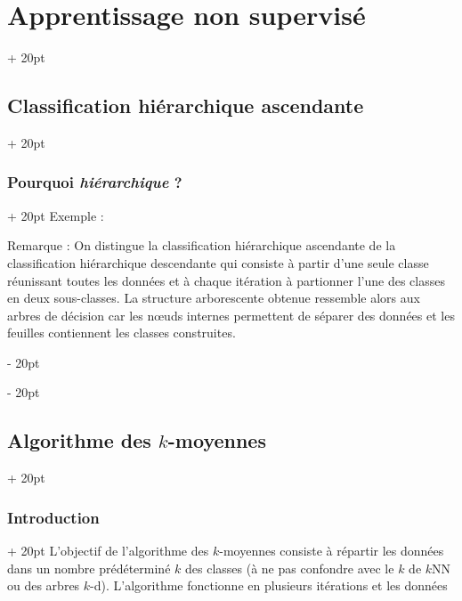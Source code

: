 \documentclass[a4paper, 12pt, twoside]{article}
\newcommand{\ind}[1][20pt]{\advance\leftskip + #1}
\newcommand{\deind}[1][20pt]{\advance\leftskip - #1}
\newenvironment{indt}[2][20pt]{#2 \par \ind[#1]}{\par \deind} %
\begin{document}
\begin{indt}{\section{Apprentissage non supervisé}}
\begin{indt}{\subsection{Classification hiérarchique ascendante}}
\begin{indt}{\subsubsection{Pourquoi \emph{hiérarchique} ?}}
                Exemple :

                \begin{center}
                \end{center}

                Remarque :
                On distingue la classification hiérarchique ascendante de la classification hiérarchique descendante qui consiste à partir d'une seule classe réunissant toutes les données et à chaque itération à partionner l'une des classes en deux sous-classes.
                La structure arborescente obtenue ressemble alors aux arbres de décision car les n\oe uds internes permettent de séparer des données et les feuilles contiennent les classes construites.
            \end{indt}
        \end{indt}

        \vspace{12pt}
        
        \begin{indt}{\subsection{Algorithme des $k$-moyennes}}
            \begin{indt}{\subsubsection{Introduction}}
                L'objectif de l'algorithme des $k$-moyennes consiste à répartir les données dans un nombre prédéterminé $k$ des classes (à ne pas confondre avec le $k$ de $k$NN ou des arbres $k$-d).
                L'algorithme fonctionne en plusieurs itérations et les données peuvent changer de classe au cours des itérations.
            \end{indt}


\end{indt}
\end{indt}
\end{document}
